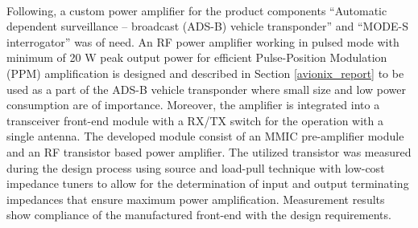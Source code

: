 \\
\indent Following, a custom power amplifier for the product components “Automatic dependent surveillance – broadcast (ADS-B) vehicle transponder” and “MODE-S interrogator” was of need. An RF power amplifier working in pulsed mode with minimum of 20 W peak output power for efficient Pulse-Position Modulation (PPM) amplification is designed and described in Section \ref{avionix_report} to be used as a part of the ADS-B vehicle transponder where small size and low power consumption are of importance. Moreover, the amplifier is integrated into a transceiver front-end module with a RX/TX switch for the operation with a single antenna. The developed module consist of an MMIC pre-amplifier module and an RF transistor based power amplifier. The utilized transistor was measured during the design process using source and load-pull technique with low-cost impedance tuners to allow for the determination of input and output terminating impedances that ensure maximum power amplification. Measurement results show compliance of the manufactured front-end with the design requirements.

\cleardoublepage



\cleardoublepage



\cleardoublepage